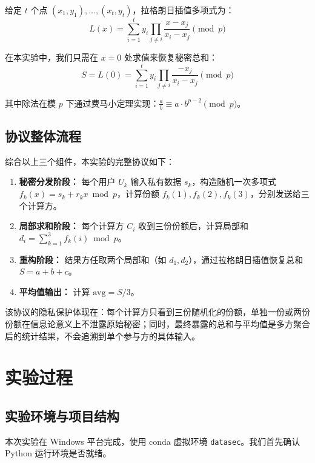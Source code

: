 \documentclass[UTF8,a4paper,10pt]{ctexart}
\begin{document}
给定 $t$ 个点 $(x_1, y_1), \dots, (x_t, y_t)$，拉格朗日插值多项式为：
\[
L(x) = \sum_{i=1}^{t} y_i \prod_{j \neq i} \frac{x - x_j}{x_i - x_j} \pmod{p}
\]

在本实验中，我们只需在 $x=0$ 处求值来恢复秘密总和：
\[
S = L(0) = \sum_{i=1}^{t} y_i \prod_{j \neq i} \frac{-x_j}{x_i - x_j} \pmod{p}
\]

其中除法在模 $p$ 下通过费马小定理实现：$\frac{a}{b} \equiv a \cdot b^{p-2} \pmod{p}$。

\subsection{协议整体流程}

综合以上三个组件，本实验的完整协议如下：

\begin{framed}
\begin{enumerate}
    \item \textbf{秘密分发阶段：} 每个用户 $U_k$ 输入私有数据 $s_k$，构造随机一次多项式 $f_k(x)=s_k+r_kx \bmod p$，计算份额 $f_k(1), f_k(2), f_k(3)$，分别发送给三个计算方。
    \item \textbf{局部求和阶段：} 每个计算方 $C_i$ 收到三份份额后，计算局部和 $d_i = \sum_{k=1}^3 f_k(i) \bmod p$。
    \item \textbf{重构阶段：} 结果方任取两个局部和（如 $d_1, d_2$），通过拉格朗日插值恢复总和 $S = a+b+c$。
    \item \textbf{平均值输出：} 计算 $\text{avg} = S / 3$。
\end{enumerate}
\end{framed}

该协议的隐私保护体现在：每个计算方只看到三份随机化的份额，单独一份或两份份额在信息论意义上不泄露原始秘密；同时，最终暴露的总和与平均值是多方聚合后的统计结果，不会追溯到单个参与方的具体输入。

\section{实验过程}

\subsection{实验环境与项目结构}

本次实验在 Windows 平台完成，使用 conda 虚拟环境 \texttt{datasec}。我们首先确认 Python 运行环境是否就绪。
\end{document}
